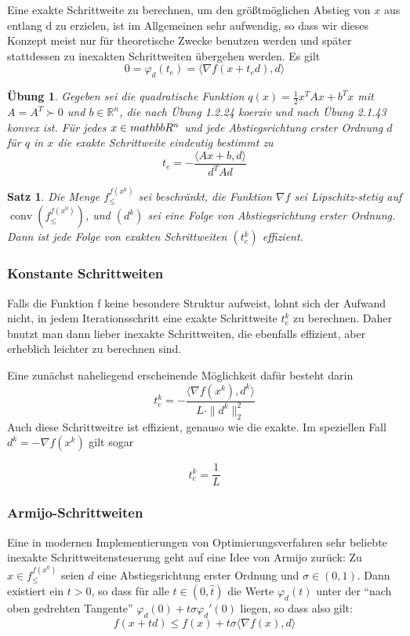 \documentclass[11pt]{scrreprt}
\newcounter{thm}
\theoremstyle{thmstyle}
\numberwithin{thm}{section}
\newtheorem{satz}[thm]{Satz}
\newtheorem{uebung}[thm]{Übung}
\begin{document}
Eine exakte Schrittweite zu berechnen, um den größtmöglichen Abstieg von $x$ aus entlang d zu erzielen, ist im Allgemeinen sehr aufwendig, so dass wir dieses Konzept meist nur für theoretische Zwecke benutzen werden und später stattdessen zu inexakten Schrittweiten übergehen werden.  Es gilt
	$$ 0 = \varphi_d(t_e) = \langle \nabla f(x + t_ed), d \rangle $$

\begin{uebung}
	Gegeben sei die quadratische Funktion $q(x) = \frac{1}{2} x^T A x + b^T x$ mit $A = A^T \succ 0$ und $b \in \mathbb{R}^n$, die nach Übung 1.2.24 koerziv und nach Übung 2.1.43 konvex ist. Für 
	jedes $x \in \\mathbb{R}^n$ und jede Abstiegsrichtung erster Ordnung $d$ 
	für $q$ in $x$ die exakte Schrittweite eindeutig bestimmt zu
	$$ t_e = - \frac{\langle Ax + b, d \rangle}{d^T A d} $$
\end{uebung}

\begin{satz}
	Die Menge $f_{\leq}^{f(x^0)}$ sei beschränkt, die Funktion $\nabla f$ sei Lipschitz-stetig auf $\operatorname{conv}(f_{\leq}^{f(x^0)})$, und $(d^k)$ sei eine Folge von Abstiegsrichtung erster Ordnung. Dann ist jede Folge von exakten Schrittweiten $(t_e^k)$ effizient.
\end{satz}

\subsubsection*{Konstante Schrittweiten}

Falls die Funktion f keine besondere Struktur aufweist, lohnt sich der Aufwand nicht, in jedem Iterationsschritt eine exakte Schrittweite $t_e^k$ zu berechnen. Daher bnutzt man dann lieber inexakte Schrittweiten, die ebenfalls effizient, aber erheblich leichter zu berechnen sind. ~\bigskip

Eine zunächst naheliegend erscheinende Möglichkeit dafür besteht darin 
 $$ t_c^k = - \frac{\langle \nabla f(x^k), d^k \rangle}{L \cdot \|d^k \|_2^2} $$
Auch diese Schrittweitre ist effizient, genauso wie die exakte. Im speziellen Fall $d^k = -\nabla f (x^k)$ gilt sogar

	$$ t_c^k = \frac{1}{L} $$
	

\subsubsection*{Armijo-Schrittweiten}
	
Eine in modernen Implementierungen von Optimierungsverfahren sehr beliebte inexakte Schrittweitensteuerung geht auf eine Idee von Armijo zurück: Zu $x \in f_{\leq}^{f(x^0)}$ seien $d$ eine Abstiegsrichtung erster Ordnung und $\sigma \in (0,1)$. Dann existiert ein $t > 0$, so dass für alle $t \in (0, \hat{t})$ die Werte $\varphi_d(t)$ unter der \enquote{nach oben gedrehten Tangente} $\varphi_d(0) + t \sigma \varphi_d'(0)$ liegen, so dass also gilt:	
	$$ f(x + td) \leq f(x) + t \sigma \langle \nabla f(x), d \rangle $$
	
\end{document}

